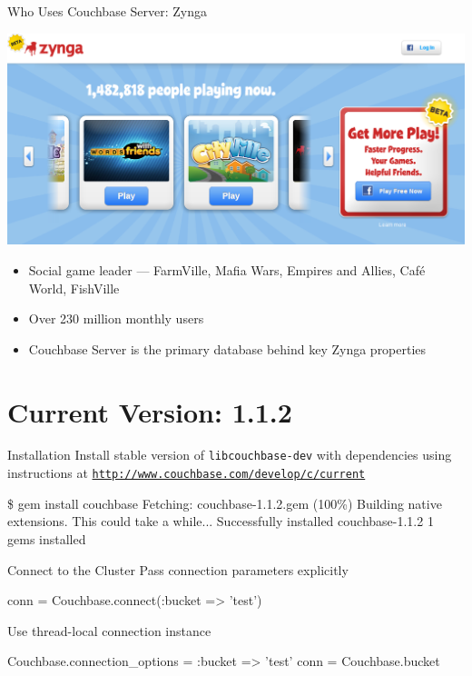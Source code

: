 \documentclass[aspectratio=43,handout]{beamer}
\begin{document}
\begin{frame}[squeeze]{Who Uses Couchbase Server: Zynga}
  \begin{center}
    \includegraphics[scale=0.18]{figures/zynga.png}
  \end{center}
  \begin{itemize}
    \item Social game leader --- FarmVille, Mafia Wars, Empires and Allies, Café World, FishVille
    \item Over 230 million monthly users
    \item Couchbase Server is the primary database behind key Zynga properties
  \end{itemize}
\end{frame}

\section{Current Version: 1.1.2}

\begin{frame}[fragile]{Installation}
  Install stable version of \texttt{libcouchbase-dev} with dependencies using instructions at
  \href{http://www.couchbase.com/develop/c/current}{\tt http://www.couchbase.com/develop/c/\alert{current}}

  \begin{semiverbatim}
  \$ gem install couchbase
  Fetching: couchbase-1.1.2.gem (100\%)
  Building native extensions.  This could take a while...
  Successfully installed couchbase-1.1.2
  1 gems installed
  \end{semiverbatim}
\end{frame}

\begin{frame}[fragile]{Connect to the Cluster}
  Pass connection parameters explicitly
  \begin{semiverbatim}
  conn = Couchbase.\alert{connect}(:bucket => 'test')
  \end{semiverbatim}

  Use thread-local connection instance
  \begin{semiverbatim}
  Couchbase.\alert{connection_options =} {:bucket => 'test'}
  conn = Couchbase.\alert{bucket}
  \end{semiverbatim}
\end{frame}
\end{document}
